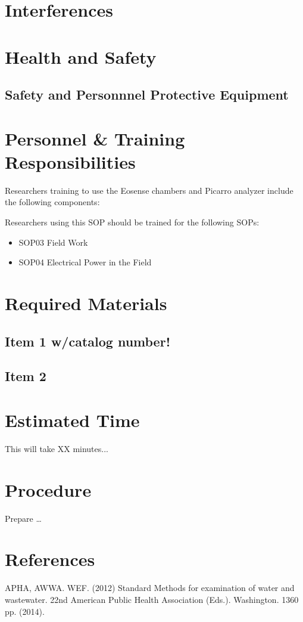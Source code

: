 \documentclass[12pt]{../SOP2}
\begin{document}
\section{Interferences}

\section{Health and Safety}

\subsection{Safety and Personnnel Protective Equipment}


\section{Personnel \& Training Responsibilities}

Researchers training to use the Eosense chambers and Picarro analyzer include the following components: 



Researchers using this SOP should be trained for the following SOPs:

\begin{itemize}
  \item SOP03 Field Work
  \item SOP04 Electrical Power in the Field
\end{itemize}

\section{Required Materials}

\subsection{Item 1 w/catalog number!}
\subsection{Item 2}

\section{Estimated Time}

\NP This will take XX minutes...

\section{Procedure}

\NP Prepare \dots

\NP

\section{References}

\NP APHA, AWWA. WEF. (2012) Standard Methods for examination of water and wastewater. 22nd American Public Health Association (Eds.). Washington. 1360 pp. (2014).
\end{document}
